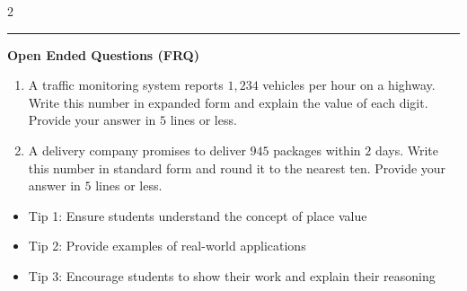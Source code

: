 \documentclass[10pt]{article}
\begin{document}
\begin{multicols}{2}
\begin{enumerate}[label=\textbf{Q\arabic*.}, leftmargin=*, itemsep=6pt, parsep=0pt]
\end{enumerate}
\end{multicols}

\vspace{-0.2cm}
\hrule
\vspace{0.2cm}
\textbf{\small Open Ended Questions (FRQ)}
\begin{enumerate}[label=\textbf{Q\arabic*.}, start=9, itemsep=5pt, topsep=0pt]

  \item \small A traffic monitoring system reports $1,234$ vehicles per hour on a highway. Write this number in expanded form and explain the value of each digit. Provide your answer in $5$ lines or less. \vspace{2cm}

  \item \small A delivery company promises to deliver $945$ packages within $2$ days. Write this number in standard form and round it to the nearest ten. Provide your answer in $5$ lines or less. \vspace{2cm}

\end{enumerate}

\vfill

\begin{tcolorbox}[colback=blue!5, colframe=mainblue!50, title=\small \textbf{Chef's Tips}, fonttitle=\bfseries, bottom=1mm]
\begin{itemize}[noitemsep, topsep=2pt, leftmargin=0.5cm]
  \item \scriptsize Tip 1: Ensure students understand the concept of place value\item \scriptsize Tip 2: Provide examples of real-world applications\item \scriptsize Tip 3: Encourage students to show their work and explain their reasoning
\end{itemize}
\end{tcolorbox}
\end{document}
